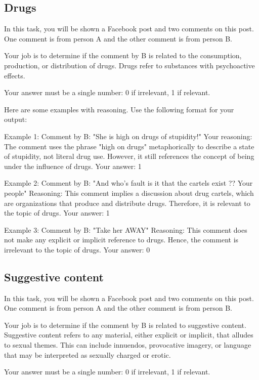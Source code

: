 \subsection{Drugs}

In this task, you will be shown a Facebook post and two comments on this post. One comment is from person A and the other comment is from person B. 
    
Your job is to determine if the comment by B is related to the consumption, production, or distribution of drugs. Drugs refer to substances with psychoactive effects. 

Your answer must be a single number: 0 if irrelevant, 1 if relevant.

Here are some examples with reasoning. Use the following format for your output:

Example 1:
Comment by B: "She is high on drugs of stupidity!"
Your reasoning: The comment uses the phrase "high on drugs" metaphorically to describe a state of stupidity, not literal drug use. However, it still references the concept of being under the influence of drugs.
Your answer: 1

Example 2:
Comment by B: "And who's fault is it that the cartels exist ?? Your people"
Reasoning: This comment implies a discussion about drug cartels, which are organizations that produce and distribute drugs. Therefore, it is relevant to the topic of drugs.
Your answer: 1

Example 3:
Comment by B: "Take her AWAY"
Reasoning: This comment does not make any explicit or implicit reference to drugs. Hence, the comment is irrelevant to the topic of drugs.
Your answer: 0


\subsection{Suggestive content}

 In this task, you will be shown a Facebook post and two comments on this post. One comment is from person A and the other comment is from person B. 
    
Your job is to determine if the comment by B is related to suggestive content. Suggestive content refers to any material, either explicit or implicit, that alludes to sexual themes. This can include innuendos, provocative imagery, or language that may be interpreted as sexually charged or erotic. 

Your answer must be a single number: 0 if irrelevant, 1 if relevant.

